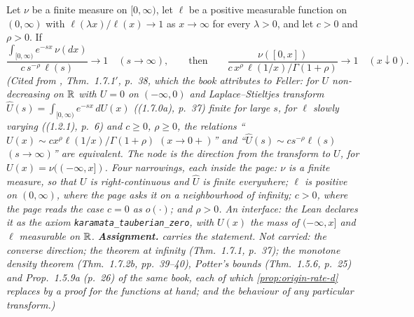 \begin{theorem}
\label{thm:cited-A11}
\leanok
Let $\nu$ be a finite measure on $[0,\infty)$, let $\ell$ be a positive measurable function on
$(0,\infty)$ with $\ell(\lambda x)/\ell(x) \to 1$ as $x \to \infty$ for every $\lambda > 0$, and
let $c > 0$ and $\rho > 0$. If
\[
  \frac{\int_{[0,\infty)} e^{-sx}\,\nu(dx)}{c\,s^{-\rho}\,\ell(s)} \to 1 \quad (s \to \infty),
  \qquad\text{then}\qquad
  \frac{\nu([0,x])}{c\,x^{\rho}\,\ell(1/x)/\Gamma(1+\rho)} \to 1 \quad (x \downarrow 0) .
\]
\statusA\quad{}\quad\emph{(Cited from , Thm.~1.7.1$'$, p.~38,
which the book attributes to Feller: for $U$ non-decreasing on $\mathbb{R}$ with $U = 0$ on
$(-\infty,0)$ and Laplace--Stieltjes transform $\widehat U(s) = \int_{[0,\infty)}e^{-sx}\,dU(x)$
((1.7.0a), p.~37) finite for large $s$, for $\ell$ slowly varying ((1.2.1), p.~6) and $c \ge 0$,
$\rho \ge 0$, the relations ``$U(x) \sim cx^{\rho}\ell(1/x)/\Gamma(1+\rho)$ $(x \to 0+)$'' and
``$\widehat U(s) \sim cs^{-\rho}\ell(s)$ $(s \to \infty)$'' are equivalent. The node is the direction
from the transform to $U$, for $U(x) = \nu((-\infty,x])$. Four narrowings, each inside the page:
$\nu$ is a finite measure, so that $U$ is right-continuous and $\widehat U$ is finite everywhere;
$\ell$ is positive on $(0,\infty)$, where the page asks it on a neighbourhood of infinity; $c > 0$,
where the page reads the case $c = 0$ as $o(\cdot)$; and $\rho > 0$. An interface: the Lean
declares it as the axiom \texttt{karamata\_tauberian\_zero}, with $U(x)$ the mass of
$(-\infty,x]$ and $\ell$ measurable on $\mathbb{R}$. \textbf{Assignment.}  carries the
statement. Not carried: the converse direction; the theorem at infinity (Thm.~1.7.1, p.~37); the
monotone density theorem (Thm.~1.7.2b, pp.~39--40), Potter's bounds (Thm.~1.5.6, p.~25) and
Prop.~1.5.9a (p.~26) of the same book, each of which \ref{prop:origin-rate-d} replaces by a proof
for the functions at hand; and the behaviour of any particular transform.)}
\end{theorem}

